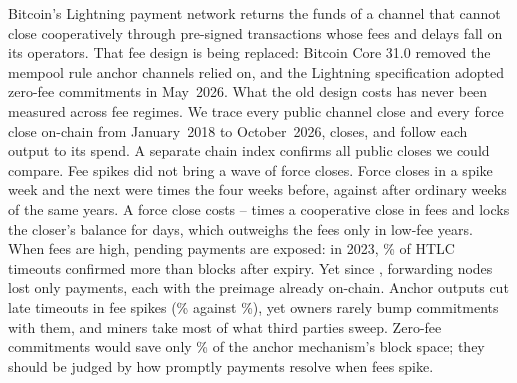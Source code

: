 Bitcoin's Lightning payment network returns the funds of a channel that cannot close cooperatively through
pre-signed transactions whose fees and delays fall on its operators. That fee design is being replaced: Bitcoin
Core 31.0 removed the mempool rule anchor channels relied on, and the Lightning specification adopted zero-fee
commitments in May~2026. What the old design costs has never been measured across fee regimes.
We trace every public channel close and every force close on-chain from January~2018 to October~2026,
\NClosesAll{} closes, and follow each output to its spend. A separate chain index confirms all \ValLakeCompared{}
public closes we could compare.
Fee spikes did not bring a wave of force closes. Force closes in a spike week and the next were \PlEvAllNow{}
times the four weeks before, against \PlEvAllNowMed{} after ordinary weeks of the same years.
A force close costs \CostRatioMin--\CostRatioMax{} times a cooperative close in fees and locks the closer's balance
for days, which outweighs the fees only in low-fee years. When fees are high, pending payments are exposed: in 2023,
\HtlcLateTwentyThree\% of HTLC timeouts confirmed more than \HtlcMarginTight{} blocks after expiry. Yet since
\SplitResFromYear, forwarding nodes lost only \SplitResForwarderPayments{} payments, each with the preimage already
on-chain. Anchor outputs cut late timeouts in fee spikes (\HtlcLateSpikeAnchor\% against
\HtlcLateSpikeLegacy\%), yet owners rarely bump commitments with them, and miners take most of what third parties
sweep. Zero-fee commitments would save only \CfSavingPct\% of the anchor mechanism's block space; they should be
judged by how promptly payments resolve when fees spike.

